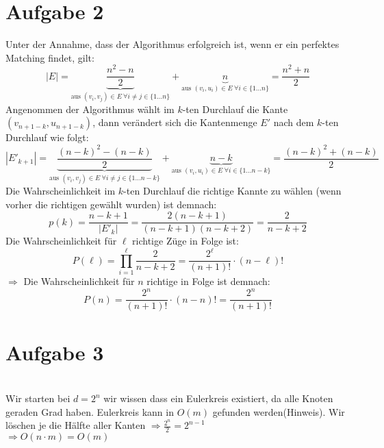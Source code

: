 \documentclass[a4paper,11pt,twoside]{scrartcl}
\begin{document}
\section*{Aufgabe 2}
Unter der Annahme, dass der Algorithmus erfolgreich ist, wenn er ein perfektes Matching findet, gilt:
\[ |E| = \underset{\text{aus }(v_i,v_j) \in E ~\forall i\neq j \in \{1\ldots n\}}{\underbrace{\frac{n^2-n}{2}}} + \underset{\text{aus } (v_i,u_i) \in E ~\forall i\in\{ 1\ldots n \} }{\underbrace{n}}   = \frac{n^2+n}{2}\]
Angenommen der Algorithmus wählt im $k$-ten Durchlauf die Kante $(v_{n+1-k}, u_{n+1-k})$, dann verändert sich die Kantenmenge $E'$ nach dem $k$-ten Durchlauf wie folgt:
\[ |E'_{k+1}| = \underset{\text{aus }(v_i,v_j) \in E ~\forall i\neq j \in \{1\ldots n-k\}}{\underbrace{\frac{(n-k)^2-(n-k)}{2}}} + \underset{\text{aus } (v_i,u_i) \in E ~\forall i\in\{ 1\ldots n-k \} }{\underbrace{n-k}}   = \frac{(n-k)^2+(n-k)}{2}\]
Die Wahrscheinlichkeit im $k$-ten Durchlauf die richtige Kannte zu wählen (wenn vorher die richtigen gewählt wurden) ist demnach:
\[ p(k) = \frac{n-k+1}{|E'_k|} = \frac{2(n-k+1)}{(n-k+1)(n-k + 2)} = \frac{2}{n-k+2}  \]
Die Wahrscheinlichkeit für $\ell$ richtige Züge in Folge ist:
\[ P(\ell) = \prod_{i=1}^{\ell}\frac{2}{n-k+2} = \frac{2^\ell}{(n+1)!}\cdot(n-\ell)! \]
$\Rightarrow$ Die Wahrscheinlichkeit für $n$ richtige in Folge ist demnach:
\[ P(n) = \frac{2^n}{(n+1)!}\cdot(n-n)! = \frac{2^n}{(n+1)!} \]
\section*{Aufgabe 3}
\\
Wir starten bei $d=2^n$ wir wissen dass ein Eulerkreis existiert, da alle Knoten geraden Grad haben. Eulerkreis kann in $O(m)$ gefunden werden(Hinweis). Wir löschen je die Hälfte aller Kanten $\Rightarrow \frac{2^n}{2} = 2^{n-1}$ \\
$\Rightarrow O(n\cdot m) = O(m)$
\end{document}

